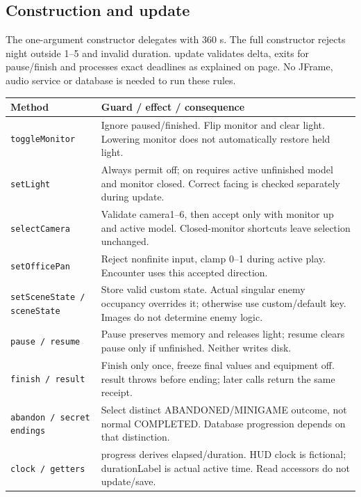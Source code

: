 \documentclass[11pt,a4paper]{article}
\newcommand{\code}[1]{\nolinkurl{#1}}
\begin{document}
\subsection*{Construction and update}
The one-argument constructor delegates with 360 s. The full constructor rejects night outside 1--5 and invalid duration. update validates delta, exits for pause/finish and processes exact deadlines as explained on page\pageref{p:rules}. No JFrame, audio service or database is needed to run these rules.
\par\noindent\begin{tabularx}{\linewidth}{L{.29\linewidth}X}\toprule\textbf{Method}&\textbf{Guard / effect / consequence}\\\midrule
\code{toggleMonitor}&Ignore paused/finished. Flip monitor and clear light. Lowering monitor does not automatically restore held light.\\
\code{setLight}&Always permit off; on requires active unfinished model and monitor closed. Correct facing is checked separately during update.\\
\code{selectCamera}&Validate camera1--6, then accept only with monitor up and active model. Closed-monitor shortcuts leave selection unchanged.\\
\code{setOfficePan}&Reject nonfinite input, clamp 0--1 during active play. Encounter uses this accepted direction.\\
\code{setSceneState / sceneState}&Store valid custom state. Actual singular enemy occupancy overrides it; otherwise use custom/default key. Images do not determine enemy logic.\\
\code{pause / resume}&Pause preserves memory and releases light; resume clears pause only if unfinished. Neither writes disk.\\
\code{finish / result}&Finish only once, freeze final values and equipment off. result throws before ending; later calls return the same receipt.\\
\code{abandon / secret endings}&Select distinct ABANDONED/MINIGAME outcome, not normal COMPLETED. Database progression depends on that distinction.\\
\code{clock / getters}&progress derives elapsed/duration. HUD clock is fictional; durationLabel is actual active time. Read accessors do not update/save.\\\bottomrule\end{tabularx}\par
\end{document}
